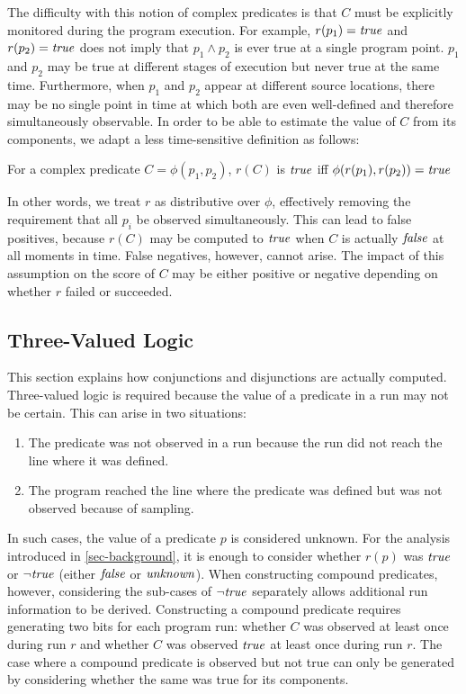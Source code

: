 The difficulty with this notion of complex predicates is that $C$ must be explicitly monitored during the program execution.  For example, $r(p_1) = \mathit{true}$ and $r(p_2) = \mathit{true}$ does not imply that $p_1 \wedge p_2$ is ever true at a single program point.  $p_1$ and $p_2$ may be true at different stages of execution but never true at the same time.  Furthermore, when $p_1$ and $p_2$ appear at different source locations, there may be no single point in time at which both are even well-defined and therefore simultaneously observable.  In order to be able to estimate the value of $C$ from its components, we adapt a less time-sensitive definition as follows:
\begin{defn}
\label{dfn2}
For a complex predicate $C = \phi(p_1, p_2)$, $r(C)$ is $\mathit{true}$ iff $\phi(r(p_1), r(p_2)) = \mathit{true}$
\end{defn}

In other words, we treat $r$ as distributive over $\phi$, effectively removing the requirement that all $p_i$ be observed simultaneously.  This can lead to false positives, because $r(C)$ may be computed to $\mathit{true}$ when $C$ is actually $\mathit{false}$ at all moments in time.  False negatives, however, cannot arise.  The impact of this assumption on the score of $C$ may be either positive or negative depending on whether $r$ failed or succeeded.

\subsection{Three-Valued Logic}
\label{sec-tvl}
This section explains how conjunctions and disjunctions are actually computed.  Three-valued logic is required because the value of a predicate in a run may not be certain. This can arise in two situations:
\begin{enumerate}
\item The predicate was not observed in a run because the run did not reach the line where it was defined.
\item The program reached the line where the predicate was defined but was not observed because of sampling.
\end{enumerate}


In such cases, the value of a predicate $p$ is considered unknown.  For the 
analysis introduced in \autoref{sec-background}, it is enough to consider whether 
$r(p)$ was $\mathit{true}$ or $\neg \mathit{true}$ (either $\mathit{false}$ or $\mathit{unknown}$).  When 
constructing compound predicates, however, considering the sub-cases of 
$\neg \mathit{true}$ separately allows additional run information to be derived.  
Constructing a compound predicate requires generating two bits for each program
run: whether $C$ was observed at least once during run $r$ and whether $C$ was
observed $\mathit{true}$ at least once during run $r$.  The case where a compound 
predicate is observed but not true can only be generated by considering whether 
the same was true for its components.

